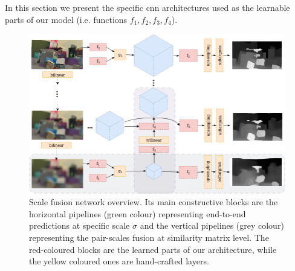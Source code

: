 \documentclass[10pt]{article}
\begin{document}
In this section we present the specific cnn architectures used as the learnable parts of our model (i.e. functions $f_1, f_2, f_3, f_4$).

\begin{figure}
    \centering
    \includegraphics[width = \textwidth]{paper/latex/figures/cnn_architecture.png}
    \caption{Scale fusion network overview. Its main constructive blocks are the horizontal pipelines (green colour) representing end-to-end predictions at specific scale $\sigma$ and the vertical pipelines (grey colour) representing the pair-scales fusion at similarity matrix level. The red-coloured blocks are the learned parts of our architecture, while the yellow coloured ones are hand-crafted layers.}
    \label{fig:cnn_architecture}
\end{figure}
\end{document}
